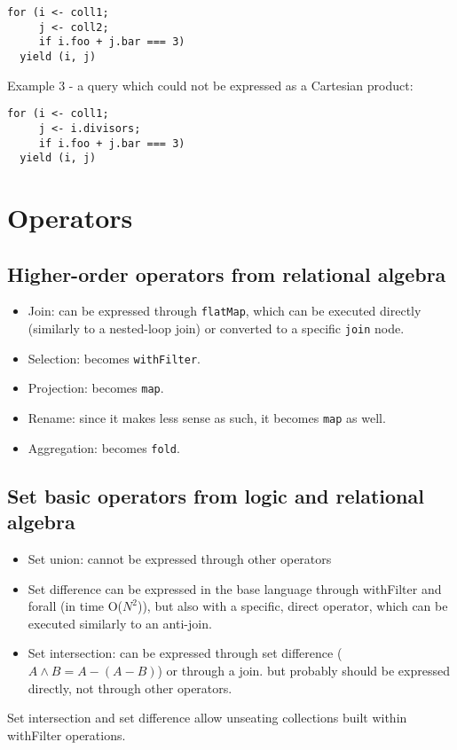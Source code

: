 \documentclass[preprint,authoryear,10pt]{sigplanconf}
\newcommand{\intersect}{\wedge}
\begin{document}
\begin{lstlisting}
for (i <- coll1;
     j <- coll2;
     if i.foo + j.bar === 3)
  yield (i, j)
\end{lstlisting}
Example 3 - a query which could not be expressed as a Cartesian product:

\begin{lstlisting}
for (i <- coll1;
     j <- i.divisors;
     if i.foo + j.bar === 3)
  yield (i, j)
\end{lstlisting}
\section{Operators}

\subsection{Higher-order operators from relational algebra}

\begin{itemize}
\item
  Join: can be expressed through \texttt{flatMap}, which can be executed
  directly (similarly to a nested-loop join) or converted to a specific
  \texttt{join} node.
\item
  Selection: becomes \texttt{withFilter}.
\item
  Projection: becomes \texttt{map}.
\item
  Rename: since it makes less sense as such, it becomes \texttt{map} as
  well.
\item
  Aggregation: becomes \texttt{fold}.
\end{itemize}
\subsection{Set basic operators from logic and relational algebra}

\begin{itemize}
\item
  Set union: cannot be expressed through other operators
\item
  Set difference can be expressed in the base language through
  withFilter and forall (in time O($N^2$)), but also with a specific,
  direct operator, which can be executed similarly to an anti-join.
\item
  Set intersection: can be expressed through set difference
  ($A \intersect B = A - (A - B)$) or through a join. but probably
  should be expressed directly, not through other operators.
\end{itemize}
Set intersection and set difference allow unseating collections built
within withFilter operations.
\end{document}

